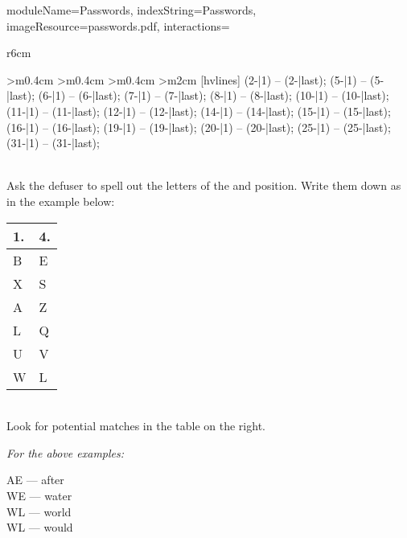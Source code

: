 \documentclass{../../ktane-mod}
\begin{document}
\begin{module}{
  moduleName=Passwords,
  indexString=Passwords,
  imageResource=passwords.pdf,
  interactions=\keysymbol
}
\begin{wraptable}{r}{6cm}
\begin{NiceTabular}{
    >{\centering\arraybackslash}m{0.4cm}
    >{\centering\arraybackslash}m{0.4cm}
    >{\centering\arraybackslash}m{0.4cm}
    >{\centering\arraybackslash}m{2cm}
    }[hvlines]
      \tikz \draw[line width=2pt, line cap=rect] (2-|1) -- (2-|last);   %
      \tikz \draw[line width=2pt, line cap=rect] (5-|1) -- (5-|last);   %
      \tikz \draw[line width=2pt, line cap=rect] (6-|1) -- (6-|last);   %
      \tikz \draw[line width=2pt, line cap=rect] (7-|1) -- (7-|last);   %
      \tikz \draw[line width=2pt, line cap=rect] (8-|1) -- (8-|last);   %
      \tikz \draw[line width=2pt, line cap=rect] (10-|1) -- (10-|last); %
      \tikz \draw[line width=2pt, line cap=rect] (11-|1) -- (11-|last); %
      \tikz \draw[line width=2pt, line cap=rect] (12-|1) -- (12-|last); %
      \tikz \draw[line width=2pt, line cap=rect] (14-|1) -- (14-|last); %
      \tikz \draw[line width=2pt, line cap=rect] (15-|1) -- (15-|last); %
      \tikz \draw[line width=2pt, line cap=rect] (16-|1) -- (16-|last); %
      \tikz \draw[line width=2pt, line cap=rect] (19-|1) -- (19-|last); %
      \tikz \draw[line width=2pt, line cap=rect] (20-|1) -- (20-|last); %
      \tikz \draw[line width=2pt, line cap=rect] (25-|1) -- (25-|last); %
      \tikz \draw[line width=2pt, line cap=rect] (31-|1) -- (31-|last); %
    \end{NiceTabular}
  \end{wraptable}
\medskip\\
  Ask the defuser to spell out the letters of the \YELLOW[first] and \YELLOW[fourth] position.
  Write them down as in the example below:

  \quad\begin{tabular}{ll}
    \textbf{1.} & \textbf{4.}\\
    \hline
    B  & E \\
    X  & S \\
    A  & Z \\
    L  & Q \\
    U  & V \\
    W  & L \\
  \end{tabular}

  \medskip\\
  Look for potential matches in the table on the right.

  \textit{For the above examples:}

  \quad AE --- after\\
  \quad WE --- water\\
  \quad WL --- world\\
  \quad WL --- would


\end{module}
\end{document}
